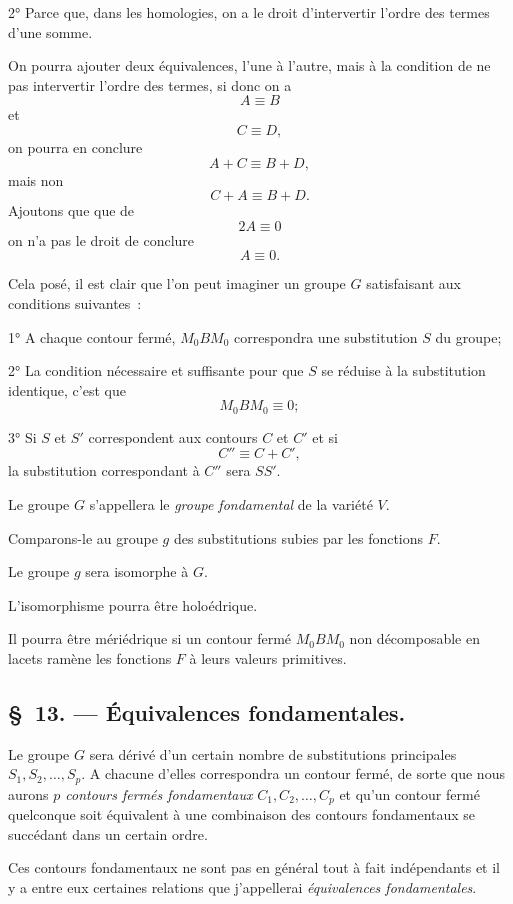 \documentclass{article}
\begin{document}
2° Parce que, dans les homologies, on a le droit d'intervertir l'ordre des termes d'une somme.

On pourra ajouter deux équivalences, l'une à l'autre, mais à la condition de ne pas intervertir l'ordre des termes, si donc on a
\[ A \equiv B \]
et
\[ C \equiv D, \]
on pourra en conclure
\[ A + C \equiv B + D, \]
mais non
\[ C + A \equiv B + D. \]
Ajoutons que que de
\[ 2A \equiv 0 \]
on n'a pas le droit de conclure
\[ A \equiv 0. \]

Cela posé, il est clair que l'on peut imaginer un groupe $G$ satisfaisant aux conditions suivantes~:

1° A chaque contour fermé, $M_{0}BM_{0}$ correspondra une substitution $S$ du groupe;

2° La condition nécessaire et suffisante pour que $S$ se réduise à la substitution identique, c'est que
\[ M_{0}BM_{0} \equiv 0; \]

3° Si $S$ et $S'$ correspondent aux contours $C$ et $C'$ et si
\[ C'' \equiv C + C', \]
la substitution correspondant à $C''$ sera $SS'$.

Le groupe $G$ s'appellera le \emph{groupe fondamental} de la variété $V$.

Comparons-le au groupe $g$ des substitutions subies par les fonctions $F$.

Le groupe $g$ sera isomorphe à $G$.

L'isomorphisme pourra être holoédrique.

Il pourra être mériédrique si un contour fermé $M_{0}BM_{0}$ non décomposable en lacets ramène les fonctions $F$ à leurs valeurs primitives.

\subsection*{\S~13. --- Équivalences fondamentales.}

Le groupe $G$ sera dérivé d'un certain nombre de substitutions principales
$S_{1}, S_{2}, \ldots, S_{p}$. A chacune d'elles correspondra un contour fermé, de sorte que nous aurons \emph{$p$ contours fermés fondamentaux} $C_{1}, C_{2}, \ldots, C_{p}$ et qu'un contour fermé quelconque soit équivalent à une combinaison des contours fondamentaux se succédant dans un certain ordre.

Ces contours fondamentaux ne sont pas en général tout à fait indépendants et il y a entre eux certaines relations que j'appellerai \emph{équivalences fondamentales}.
\end{document}
